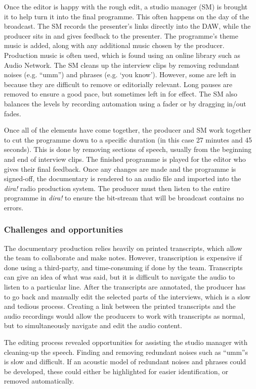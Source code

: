 Once the editor is happy with the rough edit, a studio manager (SM) is brought it to help turn it into the final
programme.  This often happens on the day of the broadcast.  The SM records the presenter's links directly into the
DAW, while the producer sits in and gives feedback to the presenter.  The programme's theme music is added, along with
any additional music chosen by the producer. Production music is often used, which is found using an online library
such as Audio Network.  The SM cleans up the interview clips by removing redundant noises (e.g. ``umm'') and phrases
(e.g. `you know'). However, some are left in because they are difficult to remove or editorially relevant. Long pauses
are removed to ensure a good pace, but sometimes left in for effect.  The SM also balances the levels by recording
automation using a fader or by dragging in/out fades. 

Once all of the elements have come together, the producer and SM work together to cut the programme down to a specific
duration (in this case 27 minutes and 45 seconds). This is done by removing sections of speech, usually from the
beginning and end of interview clips.  The finished programme is played for the editor who gives their final feedback.
Once any changes are made and the programme is signed-off, the documentary is rendered to an audio file and imported
into the \textit{dira!} radio production system. The producer must then listen to the entire programme in
\textit{dira!} to ensure the bit-stream that will be broadcast contains no errors.

\subsubsection{Challenges and opportunities}
The documentary production relies heavily on printed transcripts, which allow the team to collaborate and make notes.
However, transcription is expensive if done using a third-party, and time-consuming if done by the team.  Transcripts
can give an idea of what was said, but it is difficult to navigate the audio to listen to a particular line.  After the
transcripts are annotated, the producer has to go back and manually edit the selected parts of the interviews, which is
a slow and tedious process.  Creating a link between the printed transcripts and the audio recordings would allow the
producers to work with transcripts as normal, but to simultaneously navigate and edit the audio content.

The editing process revealed opportunities for assisting the studio manager with cleaning-up the speech. Finding and
removing redundant noises such as ``umm''s is slow and difficult. If an acoustic model of redundant noises and phrases
could be developed, these could either be highlighted for easier identification, or removed automatically.

